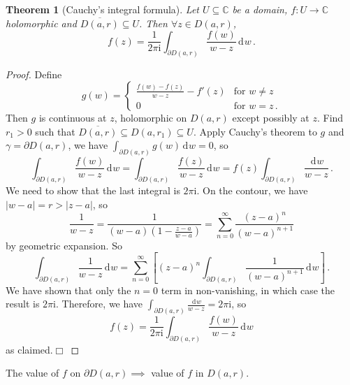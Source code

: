 \documentclass{article}
\theoremstyle{plain}\theoremheaderfont{\normalfont\itshape}\theorembodyfont{\rmfamily}\theoremseparator{.}\newtheorem*{rem}{Remark}\newtheorem*{ex}{Example}\newtheorem*{proof}{Proof}\newtheorem*{altp}{Alternative proof}\newtheorem*{con}{Consequences}\newtheorem*{notn}{Notations}\newtheorem*{cau}{Caution}\newtheorem*{term}{Terminology}\newtheorem*{keyex}{Key example}
\theoremstyle{plain}\theoremheaderfont{\normalfont\bfseries}\theorembodyfont{\rmfamily}\theoremseparator{.}\newtheorem{thm}{Theorem}[section]\newtheorem{lem}[thm]{Lemma}\newtheorem{prop}[thm]{Proposition}\newtheorem*{cor}{Corollary}\newtheorem{defn}[thm]{Definition}\newtheorem{clm}[thm]{Claim}\newtheorem{clminproof}{Claim}\newtheorem{leminproof}{Lemma}\newtheorem{app}{Application}
\theoremstyle{break}\theoremheaderfont{\normalfont\itshape}\theorembodyfont{\rmfamily}\theoremseparator{.\medskip}\newtheorem*{proofskip}{Proof}\newtheorem*{exs}{Examples}\newtheorem*{rems}{Remarks}\newtheorem*{rec}{Recall}\newtheorem*{ppts}{Properties}
\theoremstyle{break}\theoremheaderfont{\normalfont\bfseries}\theorembodyfont{\rmfamily}\theoremseparator{.\medskip}\newtheorem{lemskip}[thm]{Lemma}\newtheorem{defnskip}[thm]{Definition}\newtheorem{propskip}[thm]{Proposition}\newtheorem{thmskip}[thm]{Theorem}
\numberwithin{equation}{section}
\newcommand{\ii}{\mathrm{i}}
\newcommand{\qed}{\hfill\ensuremath{\Box}}
\newcommand{\abs}[1]{\left|#1\right|}
\newcommand{\dd}[2][]{\,\mathrm{d}^{#1} #2}
\newcommand{\CC}{\mathbb{C}}
\begin{document}
    \begin{thm}[Cauchy's integral formula]
        Let \(U\subseteq\CC\) be a domain, \(f:U\to\mathbb{C}\) holomorphic and \(\overline{D(a,r)}\subseteq U\). Then \(\forall z\in D(a,r)\),
        \[f(z)=\frac{1}{2\pi \ii}\int_{\partial D(a,r)}\frac{f(w)}{w-z}\dd{w}\,.\]
    \end{thm}
    \begin{proof}
        Define
        \[g(w)=\begin{cases}
            \frac{f(w)-f(z)}{w-z}-f'(z) & \text{for }w\ne z\\
            0 & \text{for }w=z\,.
        \end{cases}\]
        Then \(g\) is continuous at \(z\), holomorphic on \(D(a,r)\) except possibly at \(z\). Find \(r_1>0\) such that \(\overline{D(a,r)}\subseteq  D(a,r_1)\subseteq U\). Apply Cauchy's theorem to \(g\) and \(\gamma=\partial D(a,r)\), we have \(\int_{\partial D(a,r)}g(w)\dd{w}=0\), so
        \[\int_{\partial D(a,r)}\frac{f(w)}{w-z}\dd{w}=\int_{\partial D(a,r)}\frac{f(z)}{w-z}\dd{w}=f(z)\int_{\partial D(a,r)}\frac{\dd{w}}{w-z}\,.\]
        We need to show that the last integral is \(2\pi \ii\). On the contour, we have \(\abs{w-a}=r>\abs{z-a}\), so
        \[\frac{1}{w-z}=\frac{1}{(w-a)(1-\frac{z-a}{w-a})}=\sum_{n=0}^{\infty}\frac{(z-a)^n}{(w-a)^{n+1}}\]
        by geometric expansion. So
        \[\int_{\partial D(a,r)}\frac{1}{w-z}\dd{w}=\sum_{n=0}^{\infty}\left[(z-a)^n\int_{\partial D(a,r)}\frac{1}{(w-a)^{n+1}}\dd{w}\right]\,.\]
        We have shown that only the \(n=0\) term in non-vanishing, in which case the result is \(2\pi \ii\). Therefore, we have \(\int_{\partial D(a,r)}\frac{\dd{w}}{w-z}=2\pi \ii\), so
        \[f(z)=\frac{1}{2\pi \ii}\int_{\partial D(a,r)}\frac{f(w)}{w-z}\dd{w}\]
        as claimed.\qed
    \end{proof}
    \begin{figure}[ht!]
        \centering
    \end{figure}
    The value of \(f\) on \(\partial D(a,r)\implies\) value of \(f\) in \(D(a,r)\).
\end{document}
